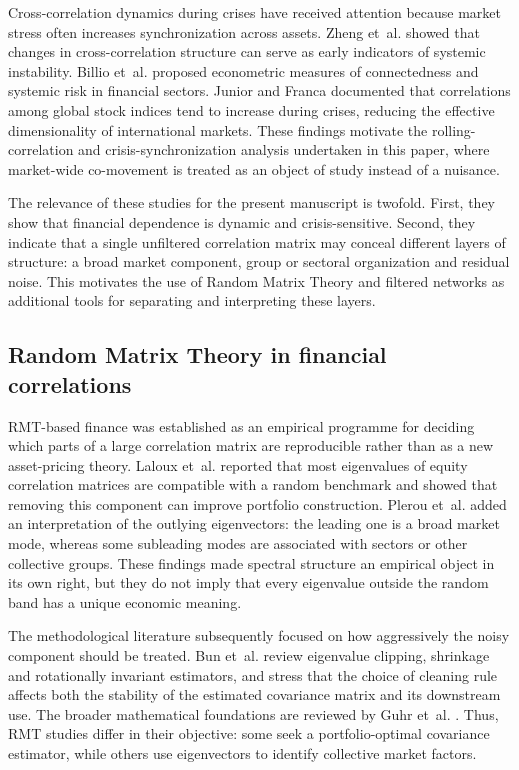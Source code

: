 Cross-correlation dynamics during crises have received attention because market stress often increases synchronization across assets. Zheng et~al. \cite{zheng_2012_changes} showed that changes in cross-correlation structure can serve as early indicators of systemic instability. Billio et~al. \cite{billio_2012_econometric} proposed econometric measures of connectedness and systemic risk in financial sectors. Junior and Franca \cite{junior_2012_correlation} documented that correlations among global stock indices tend to increase during crises, reducing the effective dimensionality of international markets. These findings motivate the rolling-correlation and crisis-synchronization analysis undertaken in this paper, where market-wide co-movement is treated as an object of study instead of a nuisance.

The relevance of these studies for the present manuscript is twofold. First, they show that financial dependence is dynamic and crisis-sensitive. Second, they indicate that a single unfiltered correlation matrix may conceal different layers of structure: a broad market component, group or sectoral organization and residual noise. This motivates the use of Random Matrix Theory and filtered networks as additional tools for separating and interpreting these layers.

\subsection{Random Matrix Theory in financial correlations}

RMT-based finance was established as an empirical programme for deciding which parts of a large correlation matrix are reproducible rather than as a new asset-pricing theory. Laloux et~al. \cite{laloux_1999_noise,laloux_2000_random} reported that most eigenvalues of equity correlation matrices are compatible with a random benchmark and showed that removing this component can improve portfolio construction. Plerou et~al. \cite{plerou_2002_random} added an interpretation of the outlying eigenvectors: the leading one is a broad market mode, whereas some subleading modes are associated with sectors or other collective groups. These findings made spectral structure an empirical object in its own right, but they do not imply that every eigenvalue outside the random band has a unique economic meaning.

The methodological literature subsequently focused on how aggressively the noisy component should be treated. Bun et~al. \cite{bun_2017_cleaning} review eigenvalue clipping, shrinkage and rotationally invariant estimators, and stress that the choice of cleaning rule affects both the stability of the estimated covariance matrix and its downstream use. The broader mathematical foundations are reviewed by Guhr et~al. \cite{guhr_muller_1998}. Thus, RMT studies differ in their objective: some seek a portfolio-optimal covariance estimator, while others use eigenvectors to identify collective market factors.

